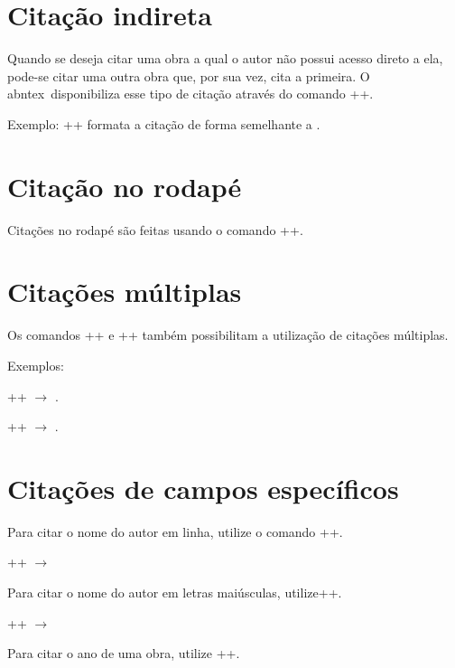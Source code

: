 \documentclass{fei}
\begin{document}
	\section{Citação indireta}
	Quando se deseja citar uma obra a qual o autor não possui acesso direto a ela, pode-se citar uma outra obra que, por sua vez, cita a primeira. O \gls{abntex}~disponibiliza esse tipo de citação através do comando \latexinline++.
	
	Exemplo: \latexinline++ formata a citação de forma semelhante a .
	
	\section{Citação no rodapé}
	
	Citações no rodapé são feitas usando o comando \latexinline++.
	
	\section{Citações múltiplas}
	
	Os comandos \latexinline+\cite{obra_1,...,obra_n}+ e \latexinline++ também possibilitam a utilização de citações múltiplas.
	
	Exemplos: 
	
	\latexinline+\cite{Mcc43,RusselNo10,haykin99a}+ \(\to\) \cite{Mcc43,RusselNo10,haykin99a}.
	
	\latexinline++ \(\to\) .
	
	\section{Citações de campos específicos}
	
	Para citar o nome do autor em linha, utilize o comando \latexinline++.

	\latexinline++ \(\to\) 
	
	Para citar o nome do autor em letras maiúsculas, utilize\latexinline+\citeauthor{obra}+.

	\latexinline+\citeauthor{galilei_dialogue_1953}+ \(\to\) \citeauthor{galilei_dialogue_1953}

	Para citar o ano de uma obra, utilize \latexinline+\citeyear{obra}+.
	
\end{document}
